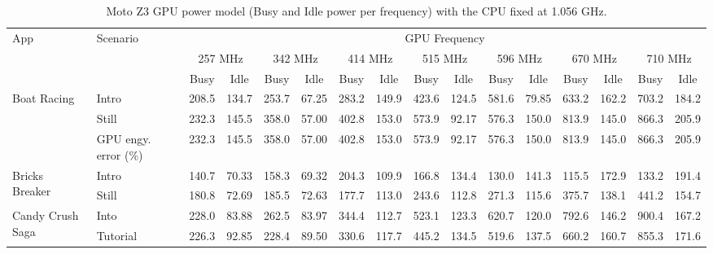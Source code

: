 
\begin{table*}[tp]
{\footnotesize
    \centering
    \caption{Moto Z3 GPU power model (Busy and Idle power per frequency) with the CPU fixed at 1.056 GHz.}
    \vspace{-0.1in}
    \begin{tabular}{|p{11.5mm}|p{22mm}|c|c|c|c|c|c|c|c|c|c|c|c|c|c|}
    \hline
    App & Scenario & \multicolumn{14}{c|}{GPU Frequency} \\
    \cline{3-16}
     &  & \multicolumn{2}{c|}{257 MHz} & \multicolumn{2}{c|}{342 MHz} & \multicolumn{2}{c|}{414 MHz} & \multicolumn{2}{c|}{515 MHz} & \multicolumn{2}{c|}{596 MHz} & \multicolumn{2}{c|}{670 MHz} & \multicolumn{2}{c|}{710 MHz} \\
     \cline{3-16}
     & & Busy & Idle & Busy & Idle & Busy & Idle & Busy & Idle & Busy & Idle & Busy & Idle & Busy & Idle \\
    \hline
       \multirow{3}{11mm}{Boat Racing}  & Intro & 208.5 & 134.7 & 253.7 & 67.25 & 283.2 & 149.9 & 423.6 & 124.5 & 581.6 & 79.85 & 633.2 & 162.2 & 703.2 & 184.2 \\
       \cline{2-16}
        & Still & 232.3 & 145.5 & 358.0 & 57.00 & 402.8 & 153.0 & 573.9 & 92.17 & 576.3 & 150.0 & 813.9 & 145.0 & 866.3 & 205.9 \\
         
         & GPU engy. error (\%) & 232.3 & 145.5 & 358.0 & 57.00 & 402.8 & 153.0 & 573.9 & 92.17 & 576.3 & 150.0 & 813.9 & 145.0 & 866.3 & 205.9 \\
         
         \hline
        \multirow{2}{11mm}{Bricks Breaker}  & Intro & 140.7 & 70.33 & 158.3 & 69.32 & 204.3 & 109.9 & 166.8 & 134.4 & 130.0 & 141.3 & 115.5 & 172.9 & 133.2 & 191.4 \\
       \cline{2-16}
         & Still & 180.8 & 72.69 & 185.5 & 72.63 & 177.7 & 113.0 & 243.6 & 112.8 & 271.3 & 115.6 & 375.7 & 138.1 & 441.2 & 154.7 \\
         \hline
        \multirow{2}{13mm}{Candy Crush Saga}  & Into & 228.0 & 83.88 & 262.5 & 83.97 & 344.4 & 112.7 & 523.1 & 123.3 & 620.7 & 120.0 & 792.6 & 146.2 & 900.4 & 167.2 \\
        \cline{2-16}
         & Tutorial & 226.3 & 92.85 & 228.4 & 89.50 & 330.6 & 117.7 & 445.2 & 134.5 & 519.6 & 137.5 & 660.2 & 160.7 & 855.3 & 171.6 \\
         \hline
    \end{tabular}
    \label{tab:gpumodel_motoz3}
    \vspace{-0.1in}
    }
\end{table*}

